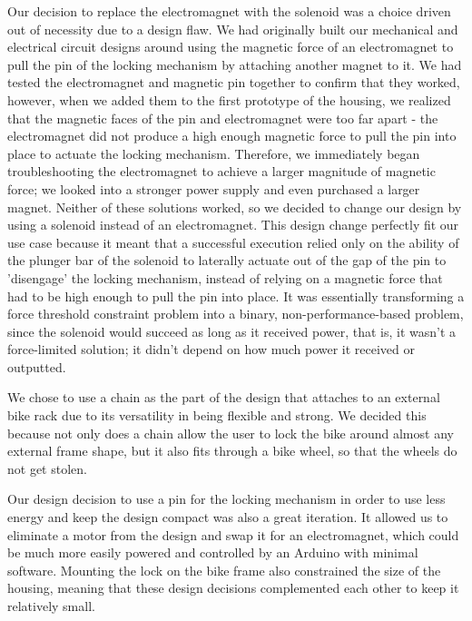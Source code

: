 \documentclass{article}
\begin{document}
Our decision to replace the electromagnet with the solenoid was a choice driven out of necessity due to a design flaw. We had originally built our mechanical and electrical circuit designs around using the magnetic  force of an electromagnet to pull the pin of the locking mechanism by attaching another magnet to it. We had tested the electromagnet and magnetic pin together to confirm that they worked, however, when we added them to the first prototype of the housing, we realized that the magnetic faces of the pin and electromagnet were too far apart - the electromagnet did not produce a high enough magnetic force to pull the pin into place to actuate the locking mechanism. Therefore, we immediately began troubleshooting the electromagnet to achieve a larger magnitude of magnetic force; we looked into a stronger power supply and even purchased a larger magnet. Neither of these solutions worked, so we decided to change our design by using a solenoid instead of an electromagnet. This design change perfectly fit our use case because it meant that a successful execution relied only on the ability of the plunger bar of the solenoid to laterally actuate out of the gap of the pin to 'disengage' the locking mechanism, instead of relying on a magnetic force that had to be high enough to pull the pin into place. It was essentially transforming a force threshold constraint problem into a binary, non-performance-based problem, since the solenoid would succeed as long as it received power, that is, it wasn't a force-limited solution; it didn't depend on how much power it received or outputted. 

We chose to use a chain as the part of the design that attaches to an external bike rack due to its versatility in being flexible and strong. We decided this because not only does a chain allow the user to lock the bike around almost any external frame shape, but it also fits through a bike wheel, so that the  wheels do not get stolen.

Our design decision to use a pin for the locking mechanism in order to use less energy and keep the design compact was also a great iteration. It allowed us to eliminate a motor from the design and swap it for an electromagnet, which could be much more easily powered and controlled by an Arduino with minimal software. Mounting the lock on the bike frame also constrained the size of the housing, meaning that these design decisions complemented each other to keep it relatively small. 
\end{document}
